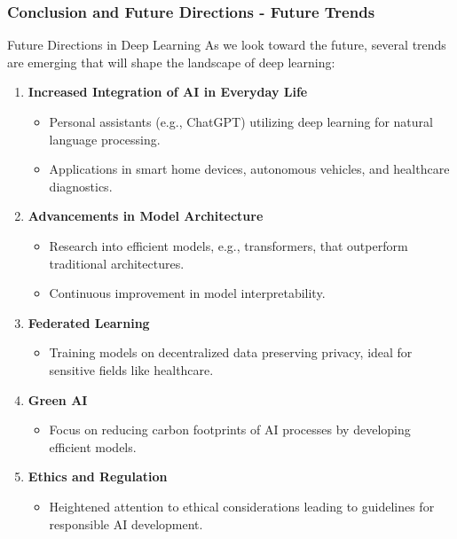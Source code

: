 \documentclass[aspectratio=169]{beamer}
\begin{document}
\begin{frame}[fragile]
    \frametitle{Conclusion and Future Directions - Future Trends}
    \begin{block}{Future Directions in Deep Learning}
        As we look toward the future, several trends are emerging that will shape the landscape of deep learning:
    \end{block}
    \begin{enumerate}
        \item \textbf{Increased Integration of AI in Everyday Life}
        \begin{itemize}
            \item Personal assistants (e.g., ChatGPT) utilizing deep learning for natural language processing.
            \item Applications in smart home devices, autonomous vehicles, and healthcare diagnostics.
        \end{itemize}

        \item \textbf{Advancements in Model Architecture}
        \begin{itemize}
            \item Research into efficient models, e.g., transformers, that outperform traditional architectures.
            \item Continuous improvement in model interpretability.
        \end{itemize}

        \item \textbf{Federated Learning}
        \begin{itemize}
            \item Training models on decentralized data preserving privacy, ideal for sensitive fields like healthcare.
        \end{itemize}
        
        \item \textbf{Green AI}
        \begin{itemize}
            \item Focus on reducing carbon footprints of AI processes by developing efficient models.
        \end{itemize}
        
        \item \textbf{Ethics and Regulation}
        \begin{itemize}
            \item Heightened attention to ethical considerations leading to guidelines for responsible AI development.
        \end{itemize}
    \end{enumerate}
\end{frame}
\end{document}
